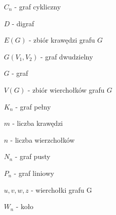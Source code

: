 $C_n$ - graf cykliczny

$D$ - digraf

$E(G)$ - zbiór krawędzi grafu $G$

$G(V_1, V_2)$ - graf dwudzielny

$G$ - graf

$V(G)$ - zbiór wierchołków grafu $G$

$K_n$ - graf pełny

$m$ - liczba krawędzi

$n$ - liczba wierzchołków

$N_n$ - graf pusty

$P_n$ - graf liniowy

$u, v, w, z$ - wierchołki grafu G

$W_n$ - koło